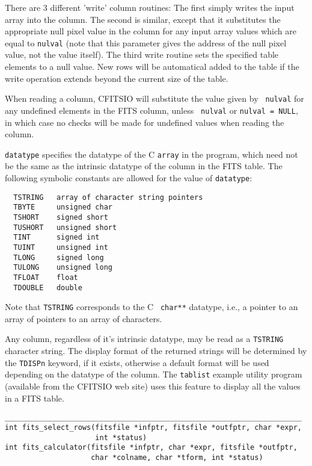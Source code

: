 \documentclass[11pt]{article}
\begin{document}
There are 3 different 'write' column routines:  The first simply writes
the input array into the column.  The second is similar, except that it
substitutes the appropriate null pixel value in the column for any
input array values which are equal to {\tt *nulval} (note that this
parameter gives the address of the null pixel value, not the value
itself).  The third write routine sets the specified table elements
to a null value.  New rows will be automatical added to the table
if the write operation extends beyond the current size of the table.

When reading a column, CFITSIO will substitute the value given by {\tt
nulval}  for  any undefined elements in the FITS column, unless {\tt
nulval} or {\tt *nulval = NULL}, in which case no checks will be made
for undefined values when reading the column.

{\tt datatype} specifies the datatype of the C {\tt array} in the program,
which need not be the same as the intrinsic datatype of the column in
the FITS table.   The following symbolic constants are allowed for the
value of {\tt datatype}:

\begin{verbatim}
  TSTRING   array of character string pointers
  TBYTE     unsigned char
  TSHORT    signed short
  TUSHORT   unsigned short
  TINT      signed int
  TUINT     unsigned int
  TLONG     signed long
  TULONG    unsigned long
  TFLOAT    float
  TDOUBLE   double
\end{verbatim}

Note that {\tt TSTRING} corresponds to the C {\tt
char**} datatype, i.e., a pointer to an array of pointers to an array
of characters.

Any column, regardless of it's intrinsic datatype, may be read as a
{\tt TSTRING} character string. The display format of the returned
strings will be determined by the {\tt TDISPn} keyword, if it exists,
otherwise a default format will be used depending on the datatype of
the column.  The {\tt tablist} example utility program (available from
the CFITSIO web site) uses this feature to display all the values in a
FITS table.

\begin{verbatim}
_____________________________________________________________________
int fits_select_rows(fitsfile *infptr, fitsfile *outfptr, char *expr,
                     int *status)
int fits_calculator(fitsfile *infptr, char *expr, fitsfile *outfptr,
                    char *colname, char *tform, int *status) 
\end{verbatim}
\end{document}
